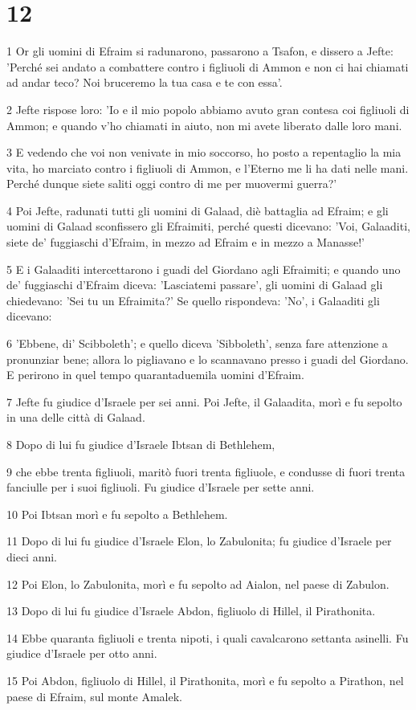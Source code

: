 \chapter{12}

\par 1 Or gli uomini di Efraim si radunarono, passarono a Tsafon, e dissero a Jefte: 'Perché sei andato a combattere contro i figliuoli di Ammon e non ci hai chiamati ad andar teco? Noi bruceremo la tua casa e te con essa'.
\par 2 Jefte rispose loro: 'Io e il mio popolo abbiamo avuto gran contesa coi figliuoli di Ammon; e quando v'ho chiamati in aiuto, non mi avete liberato dalle loro mani.
\par 3 E vedendo che voi non venivate in mio soccorso, ho posto a repentaglio la mia vita, ho marciato contro i figliuoli di Ammon, e l'Eterno me li ha dati nelle mani. Perché dunque siete saliti oggi contro di me per muovermi guerra?'
\par 4 Poi Jefte, radunati tutti gli uomini di Galaad, diè battaglia ad Efraim; e gli uomini di Galaad sconfissero gli Efraimiti, perché questi dicevano: 'Voi, Galaaditi, siete de' fuggiaschi d'Efraim, in mezzo ad Efraim e in mezzo a Manasse!'
\par 5 E i Galaaditi intercettarono i guadi del Giordano agli Efraimiti; e quando uno de' fuggiaschi d'Efraim diceva: 'Lasciatemi passare', gli uomini di Galaad gli chiedevano: 'Sei tu un Efraimita?' Se quello rispondeva: 'No', i Galaaditi gli dicevano:
\par 6 'Ebbene, di' Scibboleth'; e quello diceva 'Sibboleth', senza fare attenzione a pronunziar bene; allora lo pigliavano e lo scannavano presso i guadi del Giordano. E perirono in quel tempo quarantaduemila uomini d'Efraim.
\par 7 Jefte fu giudice d'Israele per sei anni. Poi Jefte, il Galaadita, morì e fu sepolto in una delle città di Galaad.
\par 8 Dopo di lui fu giudice d'Israele Ibtsan di Bethlehem,
\par 9 che ebbe trenta figliuoli, maritò fuori trenta figliuole, e condusse di fuori trenta fanciulle per i suoi figliuoli. Fu giudice d'Israele per sette anni.
\par 10 Poi Ibtsan morì e fu sepolto a Bethlehem.
\par 11 Dopo di lui fu giudice d'Israele Elon, lo Zabulonita; fu giudice d'Israele per dieci anni.
\par 12 Poi Elon, lo Zabulonita, morì e fu sepolto ad Aialon, nel paese di Zabulon.
\par 13 Dopo di lui fu giudice d'Israele Abdon, figliuolo di Hillel, il Pirathonita.
\par 14 Ebbe quaranta figliuoli e trenta nipoti, i quali cavalcarono settanta asinelli. Fu giudice d'Israele per otto anni.
\par 15 Poi Abdon, figliuolo di Hillel, il Pirathonita, morì e fu sepolto a Pirathon, nel paese di Efraim, sul monte Amalek.

